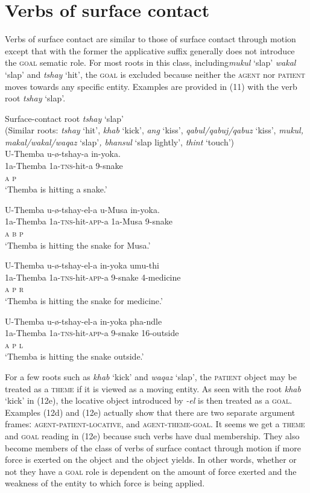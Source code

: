 \documentclass[output=paper]{langsci/langscibook}
\begin{document}
\section{Verbs of surface contact}

Verbs of surface contact are similar to those of surface contact through motion except that with the former the applicative suffix generally does not introduce the \textsc{goal} sematic role. For most roots in this class, including\textit {mukul} ‘slap’ \textit{wakal} ‘slap’ and \textit{tshay} ‘hit’, the \textsc{goal} is excluded because neither the \textsc{agent} nor \textsc{patient} moves towards any specific entity. Examples are provided in (11) with the verb root \textit{tshay} ‘slap’.

\ea
{Surface-contact root \textit {tshay }‘slap’ }\\
 (Similar roots: \textit{tshay} ‘hit’, \textit{khab} ‘kick’, \textit{ang} ‘kiss’, \textit{qabul/qabuj/qabuz} ‘kiss’, \textit{mukul, makal/wakal/waqaz }‘slap’\textit{, bhansul} ‘slap lightly’, \textit{thint} ‘touch’)\\
\ea
\gll U-Themba u-ø-tshay-a in-yoka. \\
 1a-Themba 1a-\textsc{tns}-hit-a 9-snake\\
 \textsc{a p}\\
\glt ‘Themba is hitting a snake.’

\ex
\gll U-Themba u-ø-tshay-el-a u-Musa in-yoka. \\
 1a-Themba 1a-\textsc{tns}-hit-\textsc{app}-a 1a-Musa 9-snake\\
 \textsc{a b p}\\
\glt ‘Themba is hitting the snake for Musa.’ 

\ex
\gll U-Themba u-ø-tshay-el-a in-yoka umu-thi\\
 1a-Themba 1a-\textsc{tns}-hit-\textsc{app}-a 9-snake 4-medicine\\
 \textsc{a p r}\\
\glt ‘Themba is hitting the snake for medicine.’ 

\ex
\gll U-Themba u-ø-tshay-el-a in-yoka pha-ndle \\
 1a-Themba 1a-\textsc{tns}-hit-\textsc{app}-a 9-snake 16-outside\\
 \textsc{a p l}\\
\glt ‘Themba is hitting the snake outside.’ 
\z
\z

For a few roots such as \textit{khab} ‘kick’ and \textit{waqaz} ‘slap’, the \textsc{patient} object may be treated as a \textsc{theme} if it is viewed as a moving entity. As seen with the root \textit{khab} ‘kick’ in (12e), the locative object introduced by \textit{-el} is then treated as a \textsc{goal}. Examples (12d) and (12e) actually show that there are two separate argument framesː \textsc{agent-patient-locative}, and \textsc{agent-theme-goal}. It seems we get a \textsc{theme} and \textsc{goal} reading in (12e) because such verbs have dual membership. They also become members of the class of verbs of surface contact through motion if more force is exerted on the object and the object yields. In other words, whether or not they have a \textsc{goal} role is dependent on the amount of force exerted and the weakness of the entity to which force is being applied.
\end{document}
